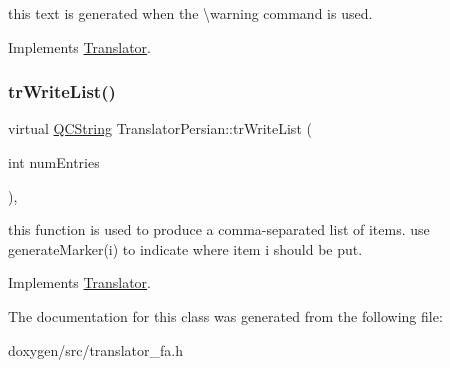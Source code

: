 this text is generated when the \textbackslash{}warning command is used. 

Implements \mbox{\hyperlink{class_translator}{Translator}}.

\mbox{\label{class_translator_persian_abb541f30146fe59839d7f0cfdc2155bd}} 
\subsubsection{\texorpdfstring{trWriteList()}{trWriteList()}}
{\footnotesize\ttfamily virtual \mbox{\hyperlink{class_q_c_string}{Q\+C\+String}} Translator\+Persian\+::tr\+Write\+List (\begin{DoxyParamCaption}\item[{int}]{num\+Entries }\end{DoxyParamCaption})\hspace{0.3cm}{\ttfamily [inline]}, {\ttfamily [virtual]}}

this function is used to produce a comma-\/separated list of items. use generate\+Marker(i) to indicate where item i should be put. 

Implements \mbox{\hyperlink{class_translator}{Translator}}.



The documentation for this class was generated from the following file\+:\begin{DoxyCompactItemize}
\item 
doxygen/src/translator\+\_\+fa.\+h\end{DoxyCompactItemize}

